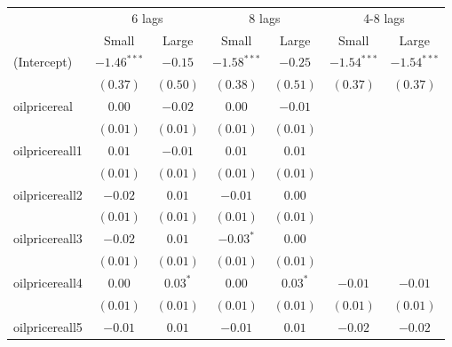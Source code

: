 \documentclass[11pt]{article}
\begin{document}
\begin{spacing}{1}
\begin{table}
\begin{center}
\begin{tabular}{l c c c c c c }
\hline
	&\multicolumn{2}{|c|}{6 lags} & \multicolumn{2}{c}{8 lags} &\multicolumn{2}{c}{4-8 lags} \\
                                     & Small & Large & Small  & Large & Small & Large\\
\hline
(Intercept)                          & $-1.46^{***}$ & $-0.15$       & $-1.58^{***}$ & $-0.25$       & $-1.54^{***}$ & $-1.54^{***}$ \\
                                     & $(0.37)$      & $(0.50)$      & $(0.38)$      & $(0.51)$      & $(0.37)$      & $(0.37)$      \\
oilpricereal                       & $0.00$        & $-0.02$       & $0.00$        & $-0.01$       &               &               \\
                                     & $(0.01)$      & $(0.01)$      & $(0.01)$      & $(0.01)$      &               &               \\
oilpricereall1                    & $0.01$        & $-0.01$       & $0.01$        & $0.01$        &               &               \\
                                     & $(0.01)$      & $(0.01)$      & $(0.01)$      & $(0.01)$      &               &               \\
oilpricereall2                    & $-0.02$       & $0.01$        & $-0.01$       & $0.00$        &               &               \\
                                     & $(0.01)$      & $(0.01)$      & $(0.01)$      & $(0.01)$      &               &               \\
oilpricereall3                    & $-0.02$       & $0.01$        & $-0.03^{*}$   & $0.00$        &               &               \\
                                     & $(0.01)$      & $(0.01)$      & $(0.01)$      & $(0.01)$      &               &               \\
oilpricereall4                    & $0.00$        & $0.03^{*}$    & $0.00$        & $0.03^{*}$    & $-0.01$       & $-0.01$       \\
                                     & $(0.01)$      & $(0.01)$      & $(0.01)$      & $(0.01)$      & $(0.01)$      & $(0.01)$      \\
oilpricereall5                    & $-0.01$       & $0.01$        & $-0.01$       & $0.01$        & $-0.02$       & $-0.02$       \\

\end{tabular}
\end{center}
\end{table}
\end{spacing}
\end{document}
